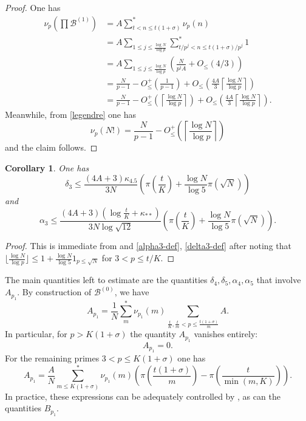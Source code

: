\documentclass[12pt,a4paper,reqno]{amsart}
\numberwithin{equation}{section}
\theoremstyle{plain}
\newtheorem{corollary}[theorem]{Corollary}
\theoremstyle{definition}
\newcommand\tuple{{\mathcal B}}
\begin{document}
\begin{proof}
One has
  \begin{align*}
    \nu_p(\prod \tuple^{(1)}) &= A \sum_{t < n \leq t(1+\sigma)}^* \nu_p(n) \\
    &= A \sum_{1 \leq j \leq \frac{\log N}{\log p}} \sum_{t/p^j < n \leq t(1+\sigma)/p^j}^* 1 \\
    &= A \sum_{1 \leq j \leq \frac{\log N}{\log p}} \left(\frac{N}{p^j A} + O_{\leq}(4/3)\right) \\
    &= \frac{N}{p-1} - O_{\leq}^+\left(\frac{1}{p-1}\right)
    + O_{\leq}\left(\frac{4A}{3} \left\lceil \frac{\log N}{\log p}  \right\rceil\right) \\
    &= \frac{N}{p-1} 
    - O_{\leq}^+\left(\left\lceil \frac{\log N}{\log p}  \right\rceil\right)
    + O_{\leq}\left(\frac{4A}{3} \left\lceil \frac{\log N}{\log p}  \right\rceil\right).
  \end{align*}
  Meanwhile, from \eqref{legendre} one has
  $$ \nu_p(N!) = \frac{N}{p-1} - O_{\leq}^+\left(\left\lceil \frac{\log N}{\log p}  \right\rceil\right)$$
and the claim follows.  
\end{proof}

\begin{corollary}\label{delta3-alpha3-bound} One has
$$ \delta_3 \leq \frac{(4A+3)\kappa_{4.5}}{3N} \left(\pi\left(\frac{t}{K} \right) + \frac{\log N}{\log 5} \pi\left(\sqrt{N}\right)\right)$$
and
$$ \alpha_3 \leq \frac{(4A+3) \left(\log \frac{t}{K} + \kappa_{**}\right)}{3N\log \sqrt{12}}  \left(\pi\left(\frac{t}{K} \right) + \frac{\log N}{\log 5} \pi\left(\sqrt{N}\right)\right).$$
\end{corollary}

\begin{proof} This is immediate from  and \eqref{alpha3-def}, \eqref{delta3-def} after noting that $\lfloor \frac{\log N}{\log p} \rfloor \leq 1 + \frac{\log N}{\log 5} 1_{p \leq \sqrt{N}}$ for $3 < p \leq t/K$.
\end{proof}

The main quantities left to estimate are the quantities $\delta_4, \delta_5, \alpha_4, \alpha_5$ that involve $A_{p_1}$.  By construction of $\tuple^{(0)}$, we have
$$
A_{p_1} = \frac{1}{N} \sum_m^* \nu_{p_1}(m) \sum_{\frac{t}{K}, \frac{t}{m} < p \leq \frac{t(1+\sigma)}{m}} A.
$$
In particular, for $p > K(1+\sigma)$ the quantity $A_{p_1}$ vanishes entirely:
\begin{equation}\label{ap1-vanish}
  A_{p_1} = 0.
\end{equation}
For the remaining primes $3 < p \leq K(1+\sigma)$ one has
\begin{equation}\label{ap1-small}
A_{p_1} = \frac{A}{N} \sum_{m \leq K(1+\sigma)}^* \nu_{p_1}(m) \left( \pi\left(\frac{t(1+\sigma)}{m}\right) - \pi\left(\frac{t}{\min(m,K)} \right) \right).
\end{equation}
In practice, these expressions can be adequately controlled by , as can the quantities $B_{p_1}$.
\end{document}
